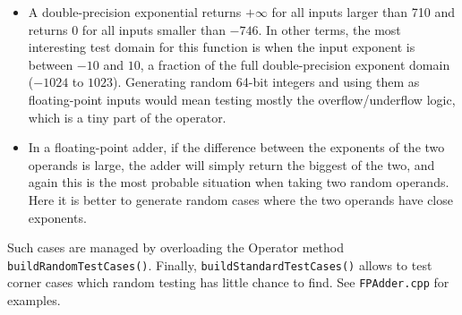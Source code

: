 \documentclass{article}
\begin{document}
\begin{itemize}\item 
  A double-precision exponential returns $+\infty$ for all inputs
  larger than 710 and returns $0$ for all inputs smaller than
  $-746$. In other terms, the most interesting test domain for this
  function is when the input exponent is between $-10$ and $10$, a
  fraction of the full double-precision exponent domain ($-1024$ to
  $1023$). Generating random 64-bit integers and using them as
  floating-point inputs would mean testing mostly the
  overflow/underflow logic, which is a tiny part of the operator.


\item In a floating-point adder, if the difference between the exponents
  of the two operands is large, the adder will simply return the
  biggest of the two, and again this is the most probable situation
  when taking two random operands. Here it is better to generate
  random cases where the two operands have close exponents.
\end{itemize}
  Such cases are managed by overloading the Operator method
  \texttt{\small buildRandomTestCases()}. Finally,
  \texttt{\small buildStandardTestCases()} allows to test corner cases which
  random testing has little chance to find. See \texttt{FPAdder.cpp} for examples.
\end{document}
